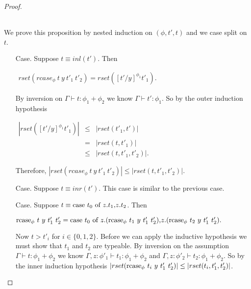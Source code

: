 \begin{proof}
\begin{itemize}
  \ \\
  We prove this proposition by nested induction on $(\phi, t', t)$ and we case split on $t$.
  \begin{itemize}
  \item[Case.] Suppose $t \equiv inl(t')$.  Then
    \begin{center}
      \begin{math}
        \begin{array}{lll}
          rset(rcase_{\phi}\ t\ y\ t'_1\ t'_2) = rset([t'/y]^{\phi_1} t'_1).
        \end{array}
      \end{math}
    \end{center}
    By inversion on $\Gamma \vdash t:\phi_1+\phi_2$ we know $\Gamma \vdash t':\phi_1$.  So by the outer induction
    hypothesis 
    \begin{center}
      \begin{math}
        \begin{array}{lll}
          |rset([t'/y]^{\phi_1}t'_1)| & \leq & |rset(t'_1,t')|\\
          & =    & |rset(t,t'_1)|\\
          & \leq & |rset(t,t'_1,t'_2)|.
        \end{array}
      \end{math}
    \end{center}
    Therefore, $|rset(rcase_{\phi}\ t\ y\ t'_1\ t'_2)| \leq |rset(t,t'_1,t'_2)|$.

  \item[Case.] Suppose $t \equiv inr(t')$.  This case is similar to the previous case.

  \item[Case.] Suppose $t \equiv \mbox{case}\ t_0\ \text{of}\ z\text{.}t_1\text{,}z\text{.}t_2$.  Then
    \begin{center}
      \begin{math}
        \mbox{rcase}_{\phi}\ t\ y\ t'_1\ t'_2 = 
        \mbox{case}\ t_0\ \text{of}\ z\text{.}(\mbox{rcase}_{\phi}\ t_1\ y\ t'_1\ t'_2)\text{,}z\text{.}(\mbox{rcase}_{\phi}\ t_2\ y\ t'_1\ t'_2).
      \end{math}
    \end{center}
    Now $t > t'_i$ for $i \in \{0,1,2\}$. Before we can apply the inductive hypothesis we must show that $t_1$ and $t_2$ 
    are typeable.  By inversion on the assumption $\Gamma \vdash t:\phi_1+\phi_2$ we know 
    $\Gamma,z:\phi'_1 \vdash t_1:\phi_1+\phi_2$ and $\Gamma,z:\phi'_2 \vdash t_2:\phi_1+\phi_2$.  So by the inner induction 
    hypothesis $|rset(\mbox{rcase}_{\phi}\ t_i\ y\ t'_1\ t'_2)| \leq |rset(t_i,t'_1,t'_2)|$.
        

\end{itemize}
\end{itemize}
\end{proof}
